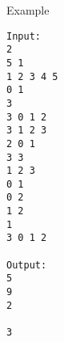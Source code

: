 Example  
\begin{verbatim}
Input:
2
5 1
1 2 3 4 5
0 1
3
3 0 1 2
3 1 2 3
2 0 1
3 3
1 2 3
0 1
0 2
1 2
1
3 0 1 2

Output:
5
9
2

3 
\end{verbatim}